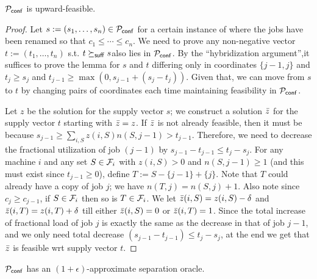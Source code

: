 \begin{lemma}\label{flem:conf-is-uf}
${\cal P}_\mathsf{conf}$ is upward-feasible.
\end{lemma}
\begin{proof}
Let $s := (s_1,\ldots,s_n)\in {\cal P}_\mathsf{conf}$ for a certain instance of \cckp where the jobs have been renamed so that $c_1\leq \cdots \leq c_n$. We need to prove any non-negative vector $t := (t_1,\ldots,t_n)$ s.t. $t\succeq_{\mathsf{suff}} s$also lies in ${\cal P}_\mathsf{conf}$.
By the ``hybridization argument'',it suffices to prove the lemma for  $s$ and $t$ differing only in coordinates $\{j-1,j\}$ and $ t_j\ge s_j$ and $t_{j-1} \geq \max(0,s_{j-1} + (s_j - t_j))$.
Given that, we can move from $s$ to $t$ by changing pairs of coordinates each time maintaining feasibility in ${\cal P}_\mathsf{conf}$.

Let $z$ be the solution for the supply vector $s$; we construct a solution $\bar z$  for the supply vector $t$ starting with $\bar z = z$.
If $\bar z$ is not already feasible, then it must be because $s_{j-1} \ge \sum_{i,S} z(i,S)n(S,j-1) > t_{j-1}$.
Therefore, we need to decrease the fractional utilization of job $(j-1)$ by $s_{j-1} - t_{j-1} \leq t_j - s_j$.
For any machine $i$ and any set $S\in {\cal F}_i$ with $z(i,S) > 0$ and $n(S,j-1) \geq 1$ (and this must exist since $t_{j-1}\geq 0$),
define $T := S - \{j-1\} + \{j\}$. Note that $T$ could already have a copy of job $j$; we have $n(T,j) = n(S,j) + 1$. Also note since $c_j \geq c_{j-1}$, if $S\in {\cal F}_i$ then so is $T\in {\cal F}_i$.
We let $\bar z(i,S) = z(i,S) - \delta$ and $\bar z(i,T) = z(i,T) + \delta$ till
either $\bar z(i,S) = 0$ or $\bar z(i,T) = 1$. Since the total increase of fractional load of job $j$ is exactly the same as the decrease in that of job $j-1$, and we only need total  decrease $(s_{j-1} -t_{j-1}) \leq t_j - s_j$, at the end we get that $\bar z$ is feasible wrt supply vector $t$.
\end{proof}
\begin{lemma}\label{flem:conf-so}
	${\cal P}_\mathsf{conf}$ has an $(1+\epsilon)$-approximate separation oracle.
\end{lemma}
